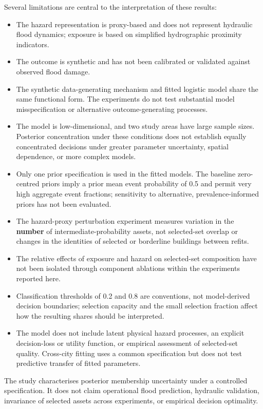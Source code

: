 \documentclass[
]{article}
\providecommand{\tightlist}{%
  \setlength{\itemsep}{0pt}\setlength{\parskip}{0pt}}
\begin{document}
Several limitations are central to the interpretation of these results:

\begin{itemize}
\tightlist
\item
  The hazard representation is proxy-based and does not represent
  hydraulic flood dynamics; exposure is based on simplified hydrographic
  proximity indicators.
\item
  The outcome is synthetic and has not been calibrated or validated
  against observed flood damage.
\item
  The synthetic data-generating mechanism and fitted logistic model
  share the same functional form. The experiments do not test
  substantial model misspecification or alternative outcome-generating
  processes.
\item
  The model is low-dimensional, and two study areas have large sample
  sizes. Posterior concentration under these conditions does not
  establish equally concentrated decisions under greater parameter
  uncertainty, spatial dependence, or more complex models.
\item
  Only one prior specification is used in the fitted models. The
  baseline zero-centred priors imply a prior mean event probability of
  0.5 and permit very high aggregate event fractions; sensitivity to
  alternative, prevalence-informed priors has not been evaluated.
\item
  The hazard-proxy perturbation experiment measures variation in the
  \textbf{number} of intermediate-probability assets, not selected-set
  overlap or changes in the identities of selected or borderline
  buildings between refits.
\item
  The relative effects of exposure and hazard on selected-set
  composition have not been isolated through component ablations within
  the experiments reported here.
\item
  Classification thresholds of 0.2 and 0.8 are conventions, not
  model-derived decision boundaries; selection capacity and the small
  selection fraction affect how the resulting shares should be
  interpreted.
\item
  The model does not include latent physical hazard processes, an
  explicit decision-loss or utility function, or empirical assessment of
  selected-set quality. Cross-city fitting uses a common specification
  but does not test predictive transfer of fitted parameters.
\end{itemize}

The study characterises posterior membership uncertainty under a
controlled specification. It does not claim operational flood
prediction, hydraulic validation, invariance of selected assets across
experiments, or empirical decision optimality.
\end{document}
